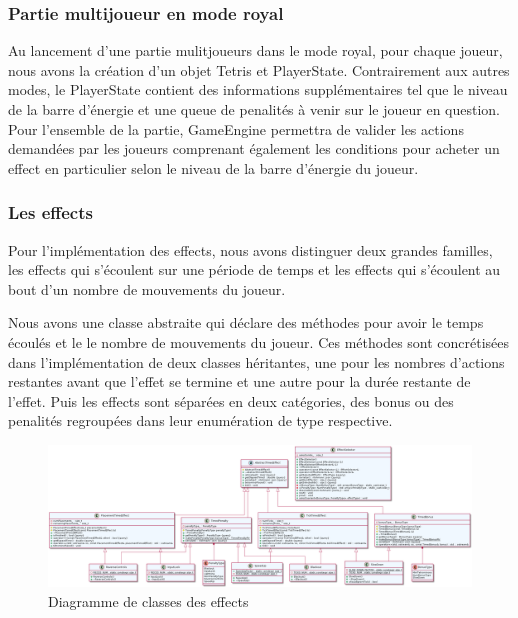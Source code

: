 \documentclass{article}
\begin{document}
\subsubsection{Partie multijoueur en mode royal}

Au lancement d'une partie mulitjoueurs dans le mode royal, pour chaque joueur, nous avons la création d'un objet Tetris et PlayerState. Contrairement aux autres modes, le PlayerState contient des informations supplémentaires tel que le niveau de la barre d'énergie et une queue de penalités à venir sur le joueur en question. Pour l'ensemble de la partie, GameEngine permettra de valider les actions demandées par les joueurs comprenant également les conditions pour acheter un effect en particulier selon le niveau de la barre d'énergie du joueur. 

\subsubsection*{Les effects}

Pour l'implémentation des effects, nous avons distinguer deux grandes familles, les effects qui s'écoulent sur une période de temps et les effects qui s'écoulent au bout d'un nombre de mouvements du joueur.

Nous avons une classe abstraite qui déclare des méthodes pour avoir le temps écoulés et le le nombre de mouvements du joueur. Ces méthodes sont concrétisées dans l'implémentation de deux classes héritantes, une pour les nombres d'actions restantes avant que l'effet se termine et une autre pour la durée restante de l'effet. Puis les effects sont séparées en deux catégories, des bonus ou des penalités regroupées dans leur enumération de type respective. 

\begin{figure}[H]
    \centering
    \includegraphics[scale=0.3, angle=90]{../res/uml/class/EffectClass.png}
    \caption{Diagramme de classes des effects}
    \label{fig:Royal-Competition}
\end{figure}
\end{document}
